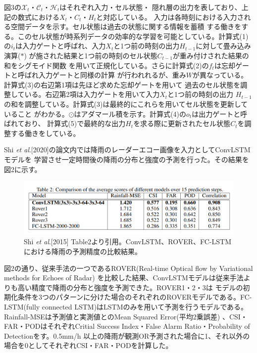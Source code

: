 図3の$\mathcal{X}_{t}$・$\mathcal{C}_{t}$・$\mathcal{H}_{t}$はそれぞれ入力・セル状態・
隠れ層の出力を表しており、上記の数式における$X_{t}$・$C_{t}$・$H_{t}$と対応している。
入力は各時刻における入力される空間データを示す。セル状態は過去の状態に関する情報を蓄積
する働きをする。このセル状態が時系列データの効率的な学習を可能としている。計算式(1)
の$i_{t}$は入力ゲートと呼ばれ、入力$X_{t}$と1つ前の時刻の出力$H_{t-1}$に対して畳み込み演算($*$)
が施された結果と1つ前の時刻のセル状態$C_{t-1}$が重み付けされた結果の和をシグモイド関数
を用いて正規化している。さらに計算式(2)の$f_{t}$は忘却ゲートと呼ばれ入力ゲートと同様の計算
が行われれるが、重み$W$が異なっている。計算式(3)の右辺第1項は先ほど求めた忘却ゲートを用いて
過去のセル状態を調整している。右辺第2項は入力ゲートを用いて入力$X_{t}$と1つ前の時刻の出力
$H_{t-1}$の和を調整している。計算式(3)は最終的にこれらを用いてセル状態を更新していること
がわかる。$\odot$はアダマール積を示す。計算式(4)の$o_{t}$は出力ゲートと呼ばれており、
計算式(5)で最終的な出力$H_{t}$を求る際に更新されたセル状態$C_{t}$を調整する働きをしている。

Shi \textit{et al}.[2020]の論文内では降雨のレーダーエコー画像を入力としてConvLSTMモデルを
学習させ一定時間後の降雨の分布と強度の予測を行った。その結果を図2に示す。

\begin{figure}[H]
\begin{center}
\includegraphics[width=0.8\linewidth]{fig/intro/shi-et-al-convlstm-mse-table.png}
\caption{Shi \textit{et al}.[2015] Table2より引用。ConvLSTM、ROVER、FC-LSTMにおける降雨の予測精度の比較結果。}
\end{center}
\end{figure}

図2の通り、従来手法の一つであるROVER(Real-time Optical flow by Variational methods for Echoes of Radar)
を比較した結果、ConvLSTMモデルは従来手法よりも高い精度で降雨の分布と強度を予測できた。ROVER1・2・3は
モデルの初期化条件を3つのパターンに分けた場合のそれぞれのROVERモデルである。FC-LSTM(fully connected 
LSTM)はLSTMのみを用いて予測を行うモデルである。Rainfall-MSEは予測値と実測値とのMean Squared Error(平均2乗誤差)
、CSI・FAR・PODはそれぞれCritial Success Index・False Alarm Ratio・Probability of Detectionをす。0.5mm/h
以上の降雨が観測OR予測された場合に1、それ以外の場合を0としてそれぞれCSI・FAR・PODを計算した。

